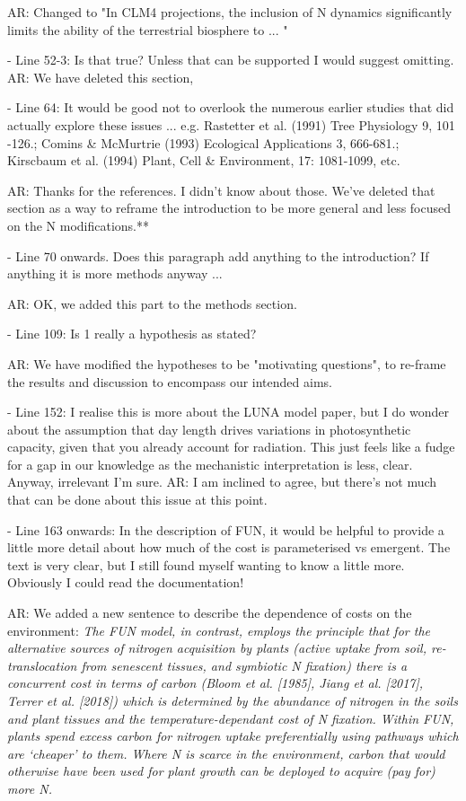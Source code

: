 \documentclass{article}
\begin{document}
\textsf{AR: Changed to "In CLM4 projections, the inclusion of N dynamics significantly limits the ability of the terrestrial biosphere to ... "}

- Line 52-3: Is that true? Unless that can be supported I would suggest omitting. 
\textsf{AR: We have deleted this section,}

- Line 64: It would be good not to overlook the numerous earlier studies that did actually explore these issues ... e.g. Rastetter et al. (1991) Tree Physiology 9, 101 -126.; Comins \& McMurtrie (1993) Ecological Applications 3, 666-681.; Kirscbaum et al. (1994) Plant, Cell \& Environment, 17: 1081-1099, etc. 

\textsf{AR: Thanks for the references. I didn't know about those. We've deleted that section as a way to reframe the introduction to be more general and less focused on the N modifications.**}

- Line 70 onwards. Does this paragraph add anything to the introduction? If anything it is more methods anyway ... 

\textsf{AR: OK, we added this part to the methods section. }

- Line 109: Is 1 really a hypothesis as stated? 

\textsf{AR: We have modified the hypotheses to be "motivating questions", to re-frame the results and discussion to encompass our intended aims.}

- Line 152: I realise this is more about the LUNA model paper, but I do wonder about the assumption that day length drives variations in photosynthetic capacity, given that you already account for radiation. This just feels like a fudge for a gap in our knowledge as the mechanistic interpretation is less, clear. Anyway, irrelevant I'm sure. 
\textsf{AR: I am inclined to agree, but there's not much that can be done about this issue at this point.} 

- Line 163 onwards: In the description of FUN, it would be helpful to provide a little more detail about how much of the cost is parameterised vs emergent. The text is very clear, but I still found myself wanting to know a little more. Obviously I could read the documentation! 

\textsf{AR: We added a new sentence to describe the dependence of costs on the environment: \emph{The FUN model, in contrast, employs the principle that for the alternative sources of nitrogen acquisition by plants (active uptake from soil, re-translocation from senescent tissues, and symbiotic N fixation) there is a concurrent cost in terms of carbon (Bloom et al. [1985], Jiang et al. [2017], Terrer et al. [2018]) which is determined by the abundance of nitrogen in the soils and plant tissues and the temperature-dependant cost of N fixation. Within FUN, plants spend excess carbon for nitrogen uptake preferentially using pathways which are `cheaper' to them. Where N is scarce in the environment, carbon that would otherwise have been used for plant growth can be deployed to acquire (pay for) more N. }}
\end{document}
